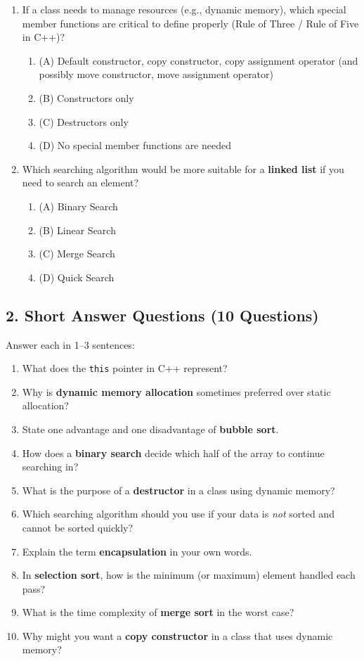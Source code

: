 \documentclass[a4paper,12pt]{article}
\begin{document}
\begin{enumerate}
    \item If a class needs to manage resources (e.g., dynamic memory), which special member functions are critical to define properly (Rule of Three / Rule of Five in C++)?
    \begin{enumerate}
        \item (A) Default constructor, copy constructor, copy assignment operator (and possibly move constructor, move assignment operator)
        \item (B) Constructors only
        \item (C) Destructors only
        \item (D) No special member functions are needed
    \end{enumerate}

    \item Which searching algorithm would be more suitable for a \textbf{linked list} if you need to search an element?
    \begin{enumerate}
        \item (A) Binary Search
        \item (B) Linear Search
        \item (C) Merge Search
        \item (D) Quick Search
    \end{enumerate}
\end{enumerate}

\newpage
\subsection{2. Short Answer Questions (10 Questions)}
Answer each in 1--3 sentences:

\begin{enumerate}
    \item What does the \texttt{this} pointer in C++ represent?
    \item Why is \textbf{dynamic memory allocation} sometimes preferred over static allocation?
    \item State one advantage and one disadvantage of \textbf{bubble sort}.
    \item How does a \textbf{binary search} decide which half of the array to continue searching in?
    \item What is the purpose of a \textbf{destructor} in a class using dynamic memory?
    \item Which searching algorithm should you use if your data is \textit{not} sorted and cannot be sorted quickly?
    \item Explain the term \textbf{encapsulation} in your own words.
    \item In \textbf{selection sort}, how is the minimum (or maximum) element handled each pass?
    \item What is the time complexity of \textbf{merge sort} in the worst case?
    \item Why might you want a \textbf{copy constructor} in a class that uses dynamic memory?
\end{enumerate}
\end{document}
